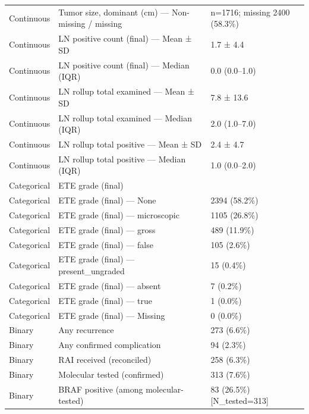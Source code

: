 \begin{table}[htbp]
\begin{tabular}{lll}
Continuous & Tumor size, dominant (cm) — Non-missing / missing & n=1716; missing 2400 (58.3\%) \\
Continuous & LN positive count (final) — Mean ± SD & 1.7 ± 4.4 \\
Continuous & LN positive count (final) — Median (IQR) & 0.0 (0.0–1.0) \\
Continuous & LN rollup total examined — Mean ± SD & 7.8 ± 13.6 \\
Continuous & LN rollup total examined — Median (IQR) & 2.0 (1.0–7.0) \\
Continuous & LN rollup total positive — Mean ± SD & 2.4 ± 4.7 \\
Continuous & LN rollup total positive — Median (IQR) & 1.0 (0.0–2.0) \\
Categorical & ETE grade (final) &  \\
Categorical & ETE grade (final) — None & 2394 (58.2\%) \\
Categorical & ETE grade (final) — microscopic & 1105 (26.8\%) \\
Categorical & ETE grade (final) — gross & 489 (11.9\%) \\
Categorical & ETE grade (final) — false & 105 (2.6\%) \\
Categorical & ETE grade (final) — present\_ungraded & 15 (0.4\%) \\
Categorical & ETE grade (final) — absent & 7 (0.2\%) \\
Categorical & ETE grade (final) — true & 1 (0.0\%) \\
Categorical & ETE grade (final) — Missing & 0 (0.0\%) \\
Binary & Any recurrence & 273 (6.6\%) \\
Binary & Any confirmed complication & 94 (2.3\%) \\
Binary & RAI received (reconciled) & 258 (6.3\%) \\
Binary & Molecular tested (confirmed) & 313 (7.6\%) \\
Binary & BRAF positive (among molecular-tested) & 83 (26.5\%) [N\_tested=313] \\
\bottomrule
\end{tabular}
\end{table}
